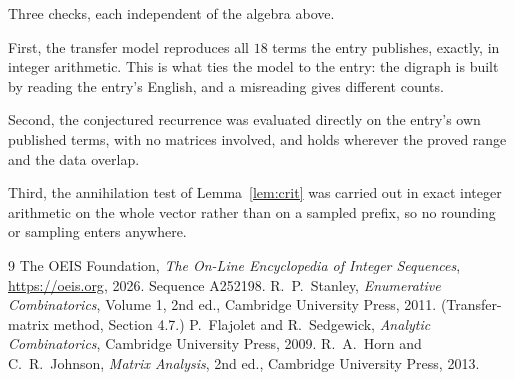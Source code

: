 \documentclass[11pt,a4paper]{article}
\theoremstyle{plain}
\theoremstyle{definition}
\begin{document}
Three checks, each independent of the algebra above.

First, the transfer model reproduces all $18$ terms the entry publishes, exactly, in
integer arithmetic. This is what ties the model to the entry: the digraph is built by reading
the entry's English, and a misreading gives different counts.

Second, the conjectured recurrence was evaluated directly on the entry's own published terms,
with no matrices involved, and holds wherever the proved range and the data overlap.

Third, the annihilation test of Lemma~\ref{lem:crit} was carried out in exact integer
arithmetic on the whole vector rather than on a sampled prefix, so no rounding or sampling
enters anywhere.

\begin{thebibliography}{9}
 The OEIS Foundation, \emph{The On-Line Encyclopedia of Integer
Sequences}, \url{https://oeis.org}, 2026. Sequence A252198.
 R.~P.~Stanley, \emph{Enumerative Combinatorics}, Volume 1, 2nd ed.,
Cambridge University Press, 2011. (Transfer-matrix method, Section 4.7.)
 P.~Flajolet and R.~Sedgewick, \emph{Analytic Combinatorics}, Cambridge
University Press, 2009.
 R.~A.~Horn and C.~R.~Johnson, \emph{Matrix Analysis}, 2nd ed., Cambridge
University Press, 2013.
\end{thebibliography}
\end{document}
